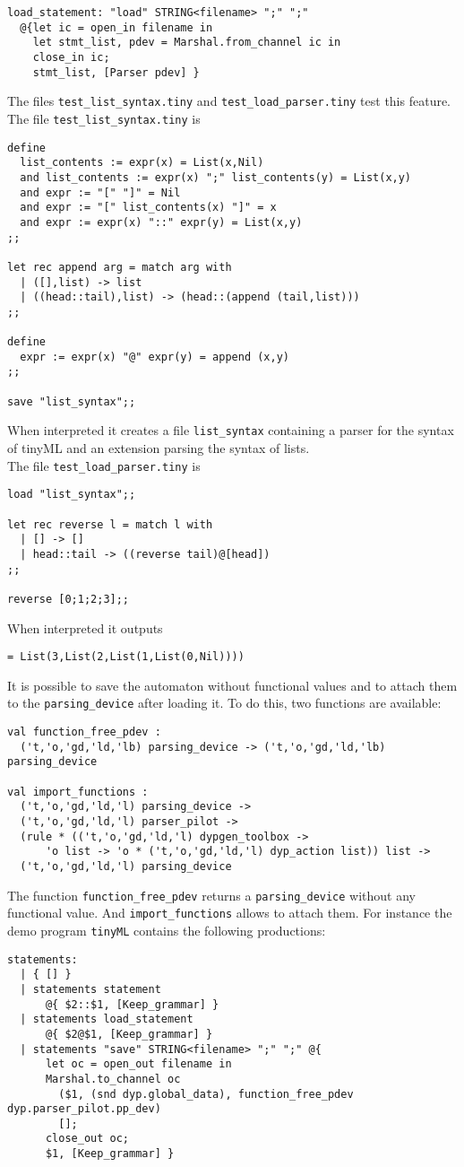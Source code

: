 \documentclass[12pt]{article}
\begin{document}
{\begin{verbatim}
load_statement: "load" STRING<filename> ";" ";"
  @{let ic = open_in filename in
    let stmt_list, pdev = Marshal.from_channel ic in
    close_in ic;
    stmt_list, [Parser pdev] }
\end{verbatim}

The files \verb|test_list_syntax.tiny| and \verb|test_load_parser.tiny| test this feature. The file \verb|test_list_syntax.tiny| is
\begin{verbatim}
define
  list_contents := expr(x) = List(x,Nil)
  and list_contents := expr(x) ";" list_contents(y) = List(x,y)
  and expr := "[" "]" = Nil
  and expr := "[" list_contents(x) "]" = x
  and expr := expr(x) "::" expr(y) = List(x,y)
;;

let rec append arg = match arg with
  | ([],list) -> list
  | ((head::tail),list) -> (head::(append (tail,list)))
;;

define
  expr := expr(x) "@" expr(y) = append (x,y)
;;

save "list_syntax";;
\end{verbatim}
When interpreted it creates a file \verb|list_syntax| containing a parser for the syntax of tinyML and an extension parsing the syntax of lists.\\
The file \verb|test_load_parser.tiny| is
\begin{verbatim}
load "list_syntax";;

let rec reverse l = match l with
  | [] -> []
  | head::tail -> ((reverse tail)@[head])
;;

reverse [0;1;2;3];;
\end{verbatim}
When interpreted it outputs
\begin{verbatim}
= List(3,List(2,List(1,List(0,Nil))))
\end{verbatim}

It is possible to save the automaton without functional values and to attach them to the \verb|parsing_device| after loading it. To do this, two functions are available:
\begin{verbatim}
val function_free_pdev :
  ('t,'o,'gd,'ld,'lb) parsing_device -> ('t,'o,'gd,'ld,'lb) parsing_device

val import_functions :
  ('t,'o,'gd,'ld,'l) parsing_device ->
  ('t,'o,'gd,'ld,'l) parser_pilot ->
  (rule * (('t,'o,'gd,'ld,'l) dypgen_toolbox ->
      'o list -> 'o * ('t,'o,'gd,'ld,'l) dyp_action list)) list ->
  ('t,'o,'gd,'ld,'l) parsing_device
\end{verbatim}
The function \verb|function_free_pdev| returns a \verb|parsing_device| without any functional value. And \verb|import_functions| allows to attach them. For instance the demo program \verb|tinyML| contains the following productions:
\begin{verbatim}
statements:
  | { [] }
  | statements statement
      @{ $2::$1, [Keep_grammar] }
  | statements load_statement
      @{ $2@$1, [Keep_grammar] }
  | statements "save" STRING<filename> ";" ";" @{
      let oc = open_out filename in
      Marshal.to_channel oc
        ($1, (snd dyp.global_data), function_free_pdev dyp.parser_pilot.pp_dev)
        [];
      close_out oc;
      $1, [Keep_grammar] }


\end{verbatim}}
\end{document}
